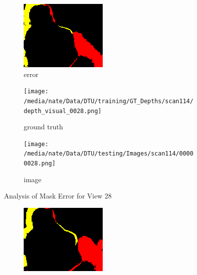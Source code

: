 \documentclass{article}
\begin{document}
\begin{figure}
\begin{subfigure}{0.3\textwidth}
		\includegraphics[width=\textwidth]{./output/028_error.png}
		\caption{error}
		\label{fig:error28}
	\end{subfigure}
	\hfill
	\centering
	\begin{subfigure}{0.3\textwidth}
		\centering
		\texttt{[image: /media/nate/Data/DTU/training/GT\_Depths/scan114/depth\_visual\_0028.png]}
		\caption{ground truth}
		\label{fig:gt28}
	\end{subfigure}
	\hfill
	\centering
	\begin{subfigure}{0.3\textwidth}
		\centering
		\texttt{[image: /media/nate/Data/DTU/testing/Images/scan114/00000028.png]}
		\caption{image}
		\label{fig:img28}
	\end{subfigure}
	\hfill
	\caption{Analysis of Mask Error for View 28}
	\label{fig:error_analys28}
\end{figure}\begin{figure}
	\centering
	\begin{subfigure}{0.3\textwidth}
		\centering
		\includegraphics[width=\textwidth]{./output/029_error.png}

\end{subfigure}
\end{figure}
\end{document}
